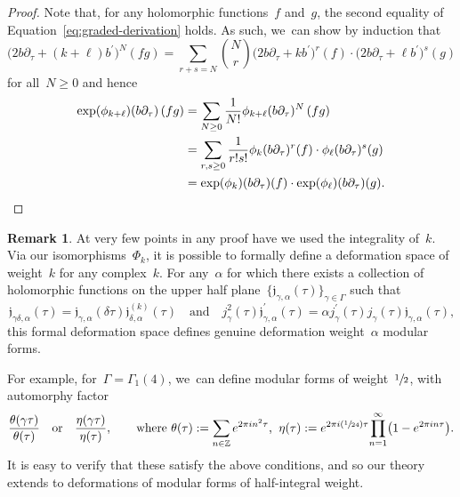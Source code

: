 \documentclass[JEP,XML,SOM,Unicode,published]{cedram}
\newcommand{\Psfrac}[2]{(\sfrac{#1}{#2})}
\theoremstyle{plain}
\theoremstyle{definition}
\newtheorem{remark}[theoremcounter]{Remark}
\newcommand{\tx}{\text}
\newcommand{\bbZ}{\ensuremath{\mathbb{Z}}}
\newcommand{\frakj}{\ensuremath{\mathfrak{j}}}
\newcommand{\defeq}{:=}
\let\Ga\Gamma
\let\ga\gamma
\begin{document}
\begin{proof}
Note that, for any holomorphic functions~$f$ and~$g$, the second equality of Equation~\eqref{eq:graded-derivation} holds. As such, we~can show by induction that
\begin{equation*}
\bigl(2b\partial_\tau+ (k+\ell)b^\prime \bigr)^N(fg)
=
\sum_{r+s=N}\binom{N}{r} \bigl(2b\partial_\tau + kb^\prime\bigr)^r(f) \cdot \bigl(2b\partial_\tau+\ell b^\prime\bigr)^s(g)
\end{equation*}
for all~$N\geq 0$ and hence
\begin{align*}
\exp(\phi_{k+\ell})(b\partial_\tau)\, (fg)
&=
\sum_{N\geq 0} \frac{1}{N!}\phi_{k+\ell}(b\partial_\tau)^N\, (fg) \\
&=
\sum_{r,s\geq 0}\frac{1}{r!s!} \phi_k(b\partial_\tau)^r(f)\cdot \phi_\ell(b\partial_\tau)^s(g)\\
&=
\exp(\phi_{k})(b\partial_\tau)(f)\cdot\exp(\phi_{\ell})(b\partial_\tau)(g)
\tx{.}\qedhere
\end{align*}
\end{proof}

\begin{remark}
At very few points in any proof have we used the integrality of~$k$. Via our isomorphisms~$\Phi_k$, it is possible to formally define a deformation space of weight~$k$ for any complex~$k$. For any~$\alpha$ for which there exists a collection of holomorphic functions on the upper half plane~$\{\frakj_{\ga,\alpha}(\tau)\}_{\ga\in\Ga}$ such that
\begin{equation*}\frakj_{\ga\delta,\alpha}(\tau) = \frakj_{\ga,\alpha}(\delta\tau)\frakj^{(k)}_{\delta,\alpha}(\tau)\quad\text{and}\quad j_\ga^2(\tau)\frakj^\prime_{\ga,\alpha}(\tau) = \alpha j^\prime_\ga(\tau)j_\ga(\tau)\frakj_{\ga,\alpha}(\tau)\tx{,}\end{equation*}
this formal deformation space defines genuine deformation weight~$\alpha$ modular forms.

For example, for~$\Ga=\Ga_1(4)$, we~can define modular forms of weight~$\sfrac{1}{2}$, with automorphy factor
\begin{equation*}
\frac{\theta(\ga\tau)}{\theta(\tau)}
\quad\tx{or}\quad
\frac{\eta(\ga\tau)}{\eta(\tau)},
\qquad\text{where\ }
\theta(\tau) \defeq \sum_{n\in\bbZ} e^{2\pi i n^2 \tau}
\tx{,}\;\;
\eta(\tau) \defeq e^{2 \pi i \Psfrac{1}{24} \tau} \!\prod_{n=1}^\infty \bigl(1 - e^{2 \pi i n \tau} \bigr)
\tx{.}
\end{equation*}
It is easy to verify that these satisfy the above conditions, and so our theory extends to deformations of modular forms of half-integral weight.
\end{remark}
\end{document}
